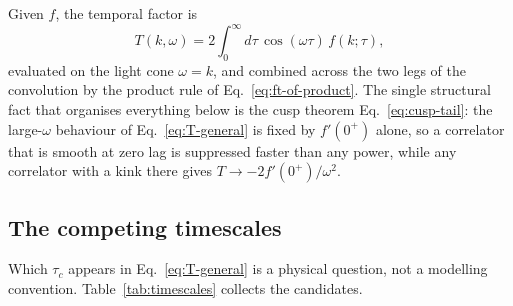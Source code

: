 \documentclass[10pt,prd,aps,nobibnotes,superscriptaddress,preprintnumbers,notitlepage]{revtex4-1}
\begin{document}
Given $f$, the temporal factor is
\begin{equation}
  T(k,\omega)=2\!\int_{0}^{\infty}\!\!d\tau\,\cos(\omega\tau)\,f(k;\tau),
  \label{eq:T-general}
\end{equation}
evaluated on the light cone $\omega=k$, and combined across the two legs of the
convolution by the product rule of Eq.~\eqref{eq:ft-of-product}. The single
structural fact that organises everything below is the cusp theorem
Eq.~\eqref{eq:cusp-tail}: the large-$\omega$ behaviour of
Eq.~\eqref{eq:T-general} is fixed by $f'(0^{+})$ alone, so a correlator that is
smooth at zero lag is suppressed faster than any power, while any correlator with
a kink there gives $T\to-2f'(0^{+})/\omega^{2}$.

\subsection{The competing timescales}
\label{sec:timescales}

Which $\tau_c$ appears in Eq.~\eqref{eq:T-general} is a physical question, not a
modelling convention. Table~\ref{tab:timescales} collects the candidates.
\end{document}
